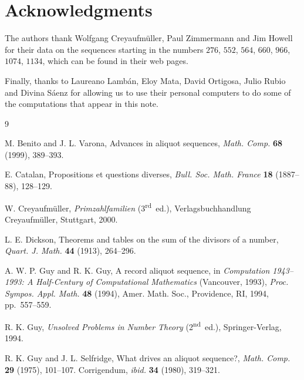 \documentclass[11pt,twoside]{article}   %
\theoremstyle{plain}
\theoremstyle{definition}
\theoremstyle{remark}
\begin{document}
\section*{Acknowledgments}

The authors thank Wolfgang Creyaufm\"uller, Paul Zimmermann and Jim Howell for their data on
the sequences starting in the numbers $276$, $552$, $564$, $660$, $966$, $1074$, $1134$,
which can be found in their web pages.

Finally, thanks to Laureano Lamb\'an, Eloy Mata, David Ortigosa, Julio Rubio
and Divina S\'aenz for allowing us to use their personal computers to do some of the
computations that appear in this note.



\begin{thebibliography}{9}

 M. Benito and J. L. Varona,
Advances in aliquot sequences,
\textit{Math. Comp.}
\textbf{68} (1999), 389--393.

 E. Catalan,
Propositions et questions diverses,
\textit{Bull. Soc. Math. France}
\textbf{18} (1887--88), 128--129.


 W. Creyaufm\"uller,
\textit{Primzahlfamilien} (3\textsuperscript{rd}~ed.),
Verlagsbuchhandlung Creyaufm{\"u}ller, Stuttgart, 2000.

 L. E. Dickson,
Theorems and tables on the sum of the divisors of a number,
\textit{Quart. J. Math.}
\textbf{44} (1913), 264--296.

 A. W. P. Guy and R. K. Guy,
A record aliquot sequence,
in \textit{Computation 1943--1993: A Half-Century of
Computational Mathematics} (Vancouver, 1993),
\textit{Proc. Sympos. Appl. Math.}
\textbf{48} (1994),
Amer. Math. Soc., Providence, RI, 1994,
pp.~557--559.

 R. K. Guy,
\textit{Unsolved Problems in Number Theory} (2\textsuperscript{nd}~ed.),
Springer-Verlag, 1994.

 R. K. Guy and J. L. Selfridge,
What drives an aliquot sequence?,
\textit{Math. Comp.}
\textbf{29} (1975), 101--107.
Corrigendum, \textit{ibid.} \textbf{34} (1980), 319--321.

\end{thebibliography}
\end{document}
